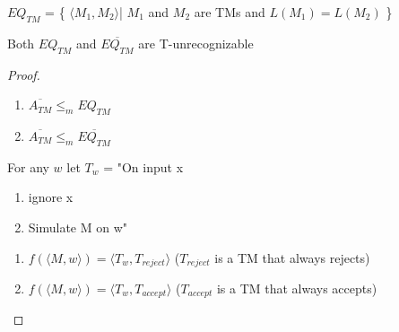 \begin{theorem}
    \(EQ_{TM}\) = \{ \(\langle M_1, M_2 \rangle\)| \(M_1\) and \(M_2\) are TMs and \(L(M_1) = L(M_2)\)  \} 

    Both \(EQ_{TM}\) and \(\overline{EQ_{TM}}\) are T-unrecognizable  
\end{theorem}
\begin{proof}
    \begin{enumerate}
        \item 
        \(
        \overline{A_{TM}} \leq_m EQ_{TM} 
        \) 
        \item
        \(
        \overline{A_{TM}} \leq_m \overline{EQ_{TM}}
        \) 
    \end{enumerate}

    For any \(w\) let \(T_w\) = "On input x
    \begin{enumerate}
        \item ignore x
        \item Simulate M on w"
    \end{enumerate}  

    \begin{enumerate}
        \item \(f(\langle M, w\rangle) = \langle T_w, T_{reject} \rangle\) (\( T_{reject}\) is a TM that always rejects) 
        \item \(f(\langle M, w\rangle) = \langle T_w, T_{accept} \rangle\) (\( T_{accept}\) is a TM that always accepts) 
    \end{enumerate}
\end{proof}
